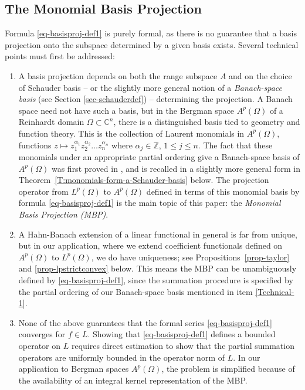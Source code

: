 \documentclass[letterpaper,11pt,reqno]{amsart}
\theoremstyle{plain}
\theoremstyle{definition}
\theoremstyle{remark}
\theoremstyle{remark}
\numberwithin{equation}{section}
\newcommand{\cx}{{\mathbb C}}
\newcommand{\Z}{{\mathbb Z}}
\begin{document}
\subsection{The Monomial Basis Projection} 
Formula \eqref{eq-basisproj-def1} is purely formal, as there is no guarantee that a basis projection onto the subspace determined by a given basis exists.
Several technical points must first be addressed:

\begin{enumerate}[wide]
\item \label{Technical-1}
A basis projection depends on both the range subspace $A$ and on the choice of Schauder basis -- or the slightly more general notion of a {\em Banach-space basis} (see Section \ref{sec-schauderdef}) -- determining the projection. 
A Banach space need not have such a basis, but in the Bergman space $A^p(\Omega)$ of a Reinhardt domain  $\Omega\subset \cx^n$, there is a distinguished basis tied to geometry and function theory. 
This is the collection of Laurent monomials in $A^p(\Omega)$, functions $z\mapsto z_1^{\alpha_1}z_2^{\alpha_2} \dots z_n^{\alpha_n}$ where  $\alpha_j\in \Z$, $1\leq j \leq n$. 
The fact that these monomials under an appropriate partial ordering give a Banach-space basis of $A^p(\Omega)$ was first proved in \cite{ChEdMc19}, and is recalled in a slightly more general form in Theorem~\ref{T:monomials-form-a-Schauder-basis} below.
The projection operator from $L^p(\Omega)$ to $A^p(\Omega)$ defined in terms of this monomial basis by formula \eqref{eq-basisproj-def1} is the main topic of this paper: the \emph{Monomial Basis Projection (MBP)}. 

\item A Hahn-Banach extension of a linear functional in general is far from unique, but in our application, where we extend coefficient functionals defined on $A^p(\Omega)$ to $L^p(\Omega)$,  {we do have uniqueness}; see  Propositions~\ref{prop-taylor} and \ref{prop-lpstrictconvex} below.
This means the MBP can be unambiguously defined by \eqref{eq-basisproj-def1}, since the summation procedure is specified by the partial ordering of our Banach-space basis mentioned in item \eqref{Technical-1}.

\item None of the above guarantees that the formal series \eqref{eq-basisproj-def1} converges for $f \in L$. Showing that \eqref{eq-basisproj-def1} defines a bounded operator on $L$ requires direct estimation to show that the partial summation operators are uniformly bounded in the operator norm of $L$. 
In our application to Bergman spaces $A^p(\Omega)$, the problem is simplified because of the availability of an integral kernel representation of the MBP.
\end{enumerate}
\end{document}
